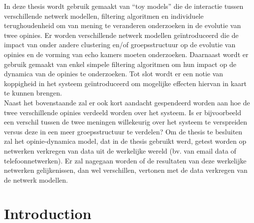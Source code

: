 \documentclass[11 pt , letterpaper , twoside , openright]{book}
\newenvironment{abstract}%
{\cleardoublepage\null \vfill\begin{center}\bfseries \abstractname \end{center}}{\vfill\null}
\begin{document}
\begin{abstract}
\newline
In deze thesis wordt gebruik gemaakt van ``toy models'' die de interactie tussen verschillende netwerk modellen, filtering algoritmen en individuele terughoudenheid om van mening te veranderen onderzoeken in de evolutie van twee opinies. Er worden verschillende netwerk modellen geïntroduceerd die de impact van onder andere clustering en/of groepsstructuur op de evolutie van opinies en de vorming van echo kamers moeten onderzoeken. Daarnaast wordt er gebruik gemaakt van enkel simpele filtering algoritmen om hun impact op de dynamica van de opinies te onderzoeken. Tot slot wordt er een notie van koppigheid in het systeem geïntroduceerd om mogelijke effecten hiervan in kaart te kunnen brengen. \\
\newline
Naast het bovenstaande zal er ook kort aandacht gespendeerd worden aan hoe de twee verschillende opinies verdeeld worden over het systeem. Is er bijvoorbeeld een verschil tussen de twee meningen willekeurig over het systeem te verspreiden versus deze in een meer groepsstructuur te verdelen? Om de thesis te besluiten zal het opinie-dynamica model, dat in de thesis gebruikt werd, getest worden op netwerken verkregen van data uit de werkelijke wereld (bv. van email data of telefoonnetwerken). Er zal nagegaan worden of de resultaten van deze werkelijke netwerken gelijkenissen, dan wel verschillen, vertonen met de data verkregen van de netwerk modellen.
\setcounter{abstractpage}{\value{page}}
\end{abstract}

\setcounter{page}{\value{abstractpage}}

\tableofcontents
{}
\listoffigures
{}
\listoftables
{}
\restoregeometry

\mainmatter



\pagestyle{fancy}
\fancyhf{}
\lhead{\textcolor{NavyBlue}{\chaptername} \ \textcolor{NavyBlue}{\thechapter}}
\rhead{\rightmark}
\cfoot{\thepage}

\chapter{Introduction}

\end{document}

